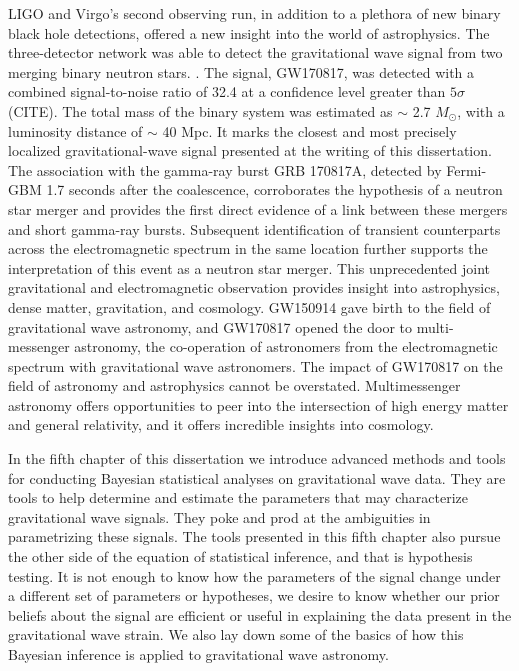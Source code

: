 LIGO and Virgo's second observing run, in addition to a plethora of new binary black hole detections, offered a new insight into the world of astrophysics. The three-detector network was able to detect the gravitational wave signal from two merging binary neutron stars. . The signal, GW170817, was detected with a combined signal-to-noise ratio of 32.4 at a confidence level greater than $5 \sigma$ (CITE). The total mass of the binary system was estimated as $\sim$ 2.7 $M_\odot$, with a luminosity distance of $\sim$ 40 Mpc. It marks the closest and most precisely localized gravitational-wave signal presented at the writing of this dissertation. The association with the gamma-ray burst GRB 170817A, detected by Fermi-GBM 1.7 seconds after the coalescence, corroborates the hypothesis of a neutron star merger and provides the first direct evidence of a link between these mergers and short gamma-ray bursts. Subsequent identification of transient counterparts across the electromagnetic spectrum in the same location further supports the interpretation of this event as a neutron star merger. This unprecedented joint gravitational and electromagnetic observation provides insight into astrophysics, dense matter, gravitation, and cosmology. GW150914 gave birth to the field of gravitational wave astronomy, and GW170817 opened the door to multi-messenger astronomy, the co-operation of astronomers from the electromagnetic spectrum with gravitational wave astronomers. The impact of GW170817 on the field of astronomy and astrophysics cannot be overstated. Multimessenger astronomy offers opportunities to peer into the intersection of high energy matter and general relativity, and it offers incredible insights into cosmology.

In the fifth chapter of this dissertation we introduce advanced methods and tools for conducting Bayesian statistical analyses on gravitational wave data. They are tools to help determine and estimate the parameters that may characterize gravitational wave signals. They poke and prod at the ambiguities in parametrizing these signals. The tools presented in this fifth chapter also pursue the other side of the equation of statistical inference, and that is hypothesis testing. It is not enough to know how the parameters of the signal change under a different set of parameters or hypotheses, we desire to know whether our prior beliefs about the signal are efficient or useful in explaining the data present in the gravitational wave strain. We also lay down some of the basics of how this Bayesian inference is applied to gravitational wave astronomy.

